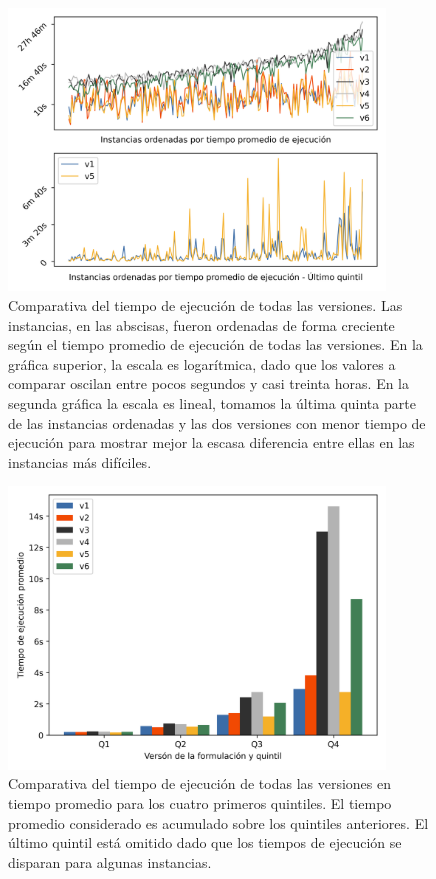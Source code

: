 \begin{figure}[h!]
  \centering
  \includegraphics[width=10cm]{../resources/run_time_comparsion.png}
  \caption{Comparativa del tiempo de ejecución de todas las versiones. Las instancias, en las abscisas, fueron ordenadas de forma creciente según el tiempo promedio de ejecución de todas las versiones. En la gráfica superior, la escala es logarítmica, dado que los valores a comparar oscilan entre pocos segundos y casi treinta horas. En la segunda gráfica la escala es lineal, tomamos la última quinta parte de las instancias ordenadas y las dos versiones con menor tiempo de ejecución para mostrar mejor la escasa diferencia entre ellas en las instancias más difíciles.}
  \label{fig:runtimecomparison}
\end{figure}

\begin{figure}[h!]
  \centering
  \includegraphics[width=10cm]{../resources/run_time_comparsion_by_quintile.png}
    \caption{Comparativa del tiempo de ejecución de todas las versiones en tiempo promedio para los cuatro primeros quintiles. El tiempo promedio considerado es acumulado sobre los quintiles anteriores. El último quintil está omitido dado que los tiempos de ejecución se disparan para algunas instancias.}
  \label{fig:firstfourquintiles}
\end{figure}


